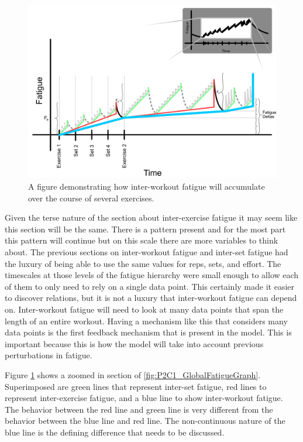 \begin{figure}[htb]
    \centering
    \includegraphics[scale=0.55]{images/p2/ch1/InterWorkoutFatigue.png}
    \caption{A figure demonstrating how inter-workout fatigue will accumulate over the course of several exercises.}
    \label{fig:P2C1_InterWorkoutFatigue}
\end{figure}

Given the terse nature of the section about inter-exercise fatigue it may seem like this section will be the same. There is a pattern present and for the most part this pattern will continue but on this scale there are more variables to think about. The previous sections on inter-workout fatigue and inter-set fatigue had the luxury of being able to use the same values for reps, sets, and effort. The timescales at those levels of the fatigue hierarchy were small enough to allow each of them to only need to rely on a single data point. This certainly made it easier to discover relations, but it is not a luxury that inter-workout fatigue can depend on. Inter-workout fatigue will need to look at many data points that span the length of an entire workout. Having a mechanism like this that considers many data points is the first feedback mechanism that is present in the model. This is important because this is how the model will take into account previous perturbations in fatigue.

Figure \ref{fig:P2C1_InterWorkoutFatigue} shows a zoomed in section of \ref{fig:P2C1_GlobalFatigueGraph}. Superimposed are green lines that represent inter-set fatigue, red lines to represent inter-exercise fatigue, and a blue line to show inter-workout fatigue. The behavior between the red line and green line is very different from the behavior between the blue line and red line. The non-continuous nature of the blue line is the defining difference that needs to be discussed.

